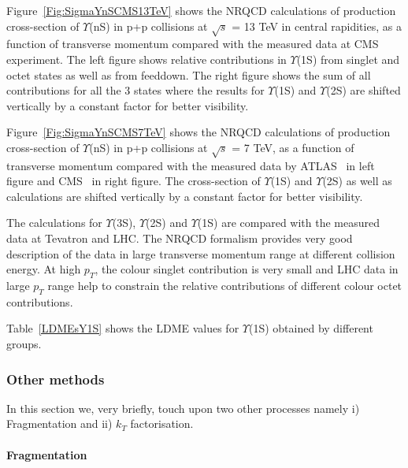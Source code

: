 Figure~\ref{Fig:SigmaYnSCMS13TeV} shows the NRQCD calculations of production cross-section of $\Upsilon$(nS)
      in p+p collisions at $\sqrt{s}$ = 13 TeV in central rapidities, as a function of
      transverse momentum compared with the measured data at CMS~\cite{Sirunyan:2017qdw}
      experiment. The left figure shows relative contributions in $\Upsilon$(1S) from
      singlet and octet states as well as from feeddown. The right figure shows the sum
      of all contributions for all the 3 states where the results for $\Upsilon$(1S) and
      $\Upsilon$(2S) are shifted vertically by a constant factor for better visibility.


Figure~\ref{Fig:SigmaYnSCMS7TeV} shows the NRQCD calculations of production cross-section of $\Upsilon$(nS) in
      p+p collisions at $\sqrt{s}$ = 7 TeV, as a function of transverse momentum compared with
      the measured data by ATLAS~\cite{Aad:2012dlq} in left figure and CMS~\cite{Chatrchyan:2013yna}
      in right figure. The cross-section of $\Upsilon$(1S) and $\Upsilon$(2S) as well as
      calculations are shifted vertically by a constant factor for better visibility.

      The calculations for  $\Upsilon$(3S), $\Upsilon$(2S) and $\Upsilon$(1S) are compared with 
the measured data at Tevatron and LHC. The NRQCD formalism provides  very good description of the data in 
large transverse momentum range at different collision energy. 
   At high $p_T$, the colour singlet contribution is very small and LHC data in large $p_T$ range 
 help to constrain the relative contributions of different colour octet contributions.
  
Table~\ref{LDMEsY1S} shows the LDME values for $\Upsilon$(1S) obtained by 
different groups.







\subsubsection{Other methods}

In this section we, very briefly, touch upon two other processes namely
i) Fragmentation and ii) $k_T$ factorisation. 

\paragraph{Fragmentation}

